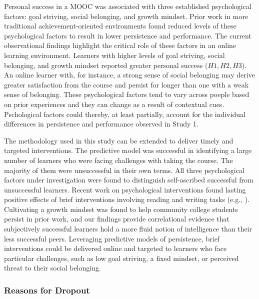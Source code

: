 \documentclass{sigchi}\usepackage[]{graphicx}\usepackage[]{color}
\begin{document}
Personal success in a MOOC was associated with three established psychological factors: goal striving, social belonging, and growth mindset. Prior work in more traditional achievement-oriented environments found reduced levels of these psychological factors to result in lower persistence and performance. The current observational findings highlight the critical role of these factors in an online learning environment. Learners with higher levels of goal striving, social belonging, and growth mindset reported greater personal success ($H1,H2,H3$). An online learner with, for instance, a strong sense of social belonging may derive greater satisfaction from the course and persist for longer than one with a weak sense of belonging. These psychological factors tend to vary across poeple based on prior experiences and they can change as a result of contextual cues. Pschological factors could thereby, at least partially, account for the individual differences in persistence and performance observed in Study 1.

The methodology used in this study can be extended to deliver timely and targeted interventions. The predictive model was successful in identifying a large number of learners who were facing challenges with taking the course. The majority of them were unsuccessful in their own terms. All three psychological factors under investigation were found to distinguish self-ascribed successful from unsuccessful learners. Recent work on psychological interventions found lasting positive effects of brief interventions involving reading and writing tasks (e.g., \cite{walton2007question}). Cultivating a growth mindset was found to help community college students persist in prior work, and our findings provide correlational evidence that subjectively successful learners hold a more fluid notion of intelligence than their less successful peers. Leveraging predictive models of persistence, brief interventions could be delivered online and targeted to learners who face particular challenges, such as low goal striving, a fixed mindset, or perceived threat to their social belonging. 

\subsubsection{Reasons for Dropout}
\end{document}
